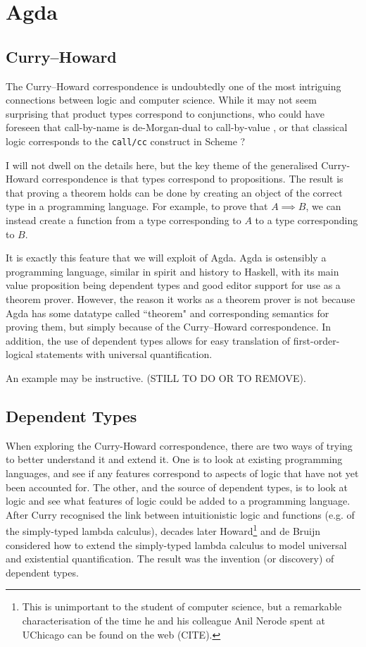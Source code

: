 \documentclass[12pt,a4paper,twoside,openright]{report}
\begin{document}
\section{Agda}
\subsection{Curry--Howard}
The Curry--Howard correspondence is undoubtedly one of the most intriguing connections between logic and computer science. While it may not seem surprising that product types correspond to conjunctions, who could have foreseen that call-by-name is de-Morgan-dual to call-by-value \cite{Ted}, or that classical logic corresponds to the \texttt{call/cc} construct in Scheme \cite{Call-cc}?

I will not dwell on the details here, but the key theme of the generalised Curry-Howard correspondence is that types correspond to propositions. The result is that proving a theorem holds can be done by creating an object of the correct type in a programming language. For example, to prove that $A \implies B$, we can instead create a function from a type corresponding to $A$ to a type corresponding to $B$. 

It is exactly this feature that we will exploit of Agda. Agda is ostensibly a programming language, similar in spirit and history to Haskell, with its main value proposition being dependent types and good editor support for use as a theorem prover. However, the reason it works as a theorem prover is not because Agda has some datatype called ``theorem" and corresponding semantics for proving them, but simply because of the Curry--Howard correspondence. In addition, the use of dependent types allows for easy translation of first-order-logical statements with universal quantification. 

An example may be instructive. (STILL TO DO OR TO REMOVE).
\subsection{Dependent Types}
When exploring the Curry-Howard correspondence, there are two ways of trying to better understand it and extend it. One is to look at existing programming languages, and see if any features correspond to aspects of logic that have not yet been accounted for. The other, and the source of dependent types, is to look at logic and see what features of logic could be added to a programming language. After Curry \cite{Curry-Howard} recognised the link between intuitionistic logic and functions (e.g. of the simply-typed lambda calculus), decades later Howard\footnote{This is unimportant to the student of computer science, but a remarkable characterisation of the time he and his colleague Anil Nerode spent at UChicago can be found on the web (CITE).} \cite{Howard} and de Bruijn considered how to extend the simply-typed lambda calculus to model universal and existential quantification. The result was the invention (or discovery) of dependent types.
\end{document}
